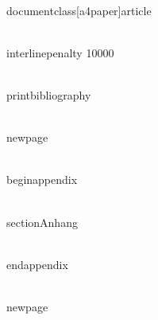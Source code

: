 \\documentclass[a4paper]{article}
\begin{document}
\\interlinepenalty 10000



\\printbibliography

\\newpage

\\begin{appendix}


\\section{Anhang}

\\end{appendix}


\\newpage




\
\end{document}
